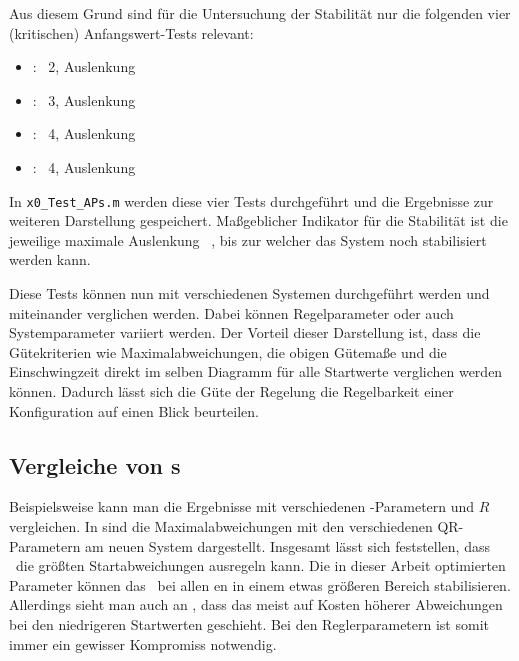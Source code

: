 Aus diesem Grund sind für die Untersuchung der Stabilität nur die folgenden vier (kritischen) Anfangswert-Tests relevant:
\begin{itemize}
	\item \texttt{\apz}: \ap\ 2, Auslenkung \phz
	\item \texttt{\apd}: \ap\ 3, Auslenkung \phe
	\item \texttt{}: \ap\ 4, Auslenkung \phe
	\item \texttt{}: \ap\ 4, Auslenkung \phz
\end{itemize}
In \texttt{x0\_Test\_APs.m} werden diese vier Tests durchgeführt und die Ergebnisse zur weiteren Darstellung gespeichert.
Maßgeblicher Indikator für die Stabilität ist die jeweilige maximale Auslenkung \phe\ \bzw \phz, bis zur welcher das System noch stabilisiert werden kann.

Diese Tests können nun mit verschiedenen Systemen durchgeführt werden und miteinander verglichen werden.
Dabei können Regelparameter oder auch Systemparameter variiert werden.
Der Vorteil dieser Darstellung ist, dass die Gütekriterien wie Maximalabweichungen, die obigen Gütemaße und die Einschwingzeit direkt im selben Diagramm für alle Startwerte verglichen werden können.
Dadurch lässt sich die Güte der Regelung \bzw die Regelbarkeit einer Konfiguration auf einen Blick beurteilen.


\subsection{Vergleiche von \xots s}\label{subsec:xotsvgl}

Beispielsweise kann man die Ergebnisse mit verschiedenen \ricc-Parametern  und $R$ vergleichen.
In  sind die Maximalabweichungen mit den verschiedenen QR-Parametern  am neuen System dargestellt.
Insgesamt lässt sich feststellen, dass \apd\ die größten Startabweichungen ausregeln kann.
Die in dieser Arbeit optimierten Parameter können das \dpd\ bei allen \ap en in einem etwas größeren Bereich stabilisieren.
Allerdings sieht man auch \zB an \apve, dass das meist auf Kosten höherer Abweichungen bei den niedrigeren Startwerten geschieht.
Bei den Reglerparametern ist somit immer ein gewisser Kompromiss notwendig.

